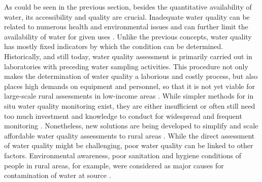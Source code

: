 As could be seen in the previous section, besides the quantitative availability of water, its accessibility and quality are crucial. Inadequate water quality can be related to numerous health and environmental issues and can further limit the availability of water for given uses \autocite{rcrcFORECASTBASEDFINANCINGEARLY2020, faoCopingWaterScarcity2012}. Unlike the previous concepts, water quality has mostly fixed indicators by which the condition can be determined. Historically, and still today, water quality assessment is primarily carried out in laboratories with preceding water sampling activities. This procedure not only makes the determination of water quality a laborious and costly process, but also places high demands on equipment and personnel, so that it is not yet viable for large-scale rural assessments in low-income areas \autocite{tariqOpenSourceWater2021,wmoPlanningWaterqualityMonitoring2013}. While simpler methods for in situ water quality monitoring exist, they are either insufficient or often still need too much investment and knowledge to conduct for widespread and frequent monitoring \autocite{wmoPlanningWaterqualityMonitoring2013}. Nonetheless, new solutions are being developed to simplify and scale affordable water quality assessments to rural areas \autocite{ighaloComprehensiveReviewWater2020,tariqOpenSourceWater2021}. While the direct assessment of water quality might be challenging, poor water quality can be linked to other factors. Environmental awareness, poor sanitation and hygiene conditions of people in rural areas, for example, were considered as major causes for contamination of water at source \autocite{zamxakaMicrobiologicalPhysicochemicalAssessment2004}.

